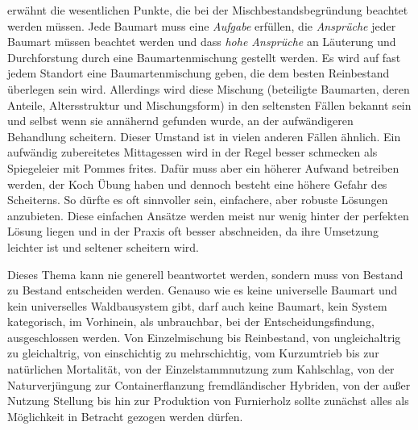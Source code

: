 \documentclass[twocolumn]{scrartcl}
\begin{document}
\citet[S.~218\,f.]{wiedemann1951Ertragskunde} erwähnt die wesentlichen Punkte,
die bei der Mischbestandsbegründung beachtet werden müssen. Jede Baumart muss
eine \emph{Aufgabe} erfüllen, die \emph{Ansprüche} jeder Baumart müssen beachtet
werden und dass \emph{hohe Ansprüche} an Läuterung und Durchforstung durch eine
Baumartenmischung gestellt werden. Es wird auf fast jedem Standort eine
Baumartenmischung geben, die dem besten Reinbestand überlegen sein wird.
Allerdings wird diese Mischung (beteiligte Baumarten, deren Anteile,
Altersstruktur und Mischungsform) in den seltensten Fällen bekannt sein und
selbst wenn sie annähernd gefunden wurde, an der aufwändigeren Behandlung
scheitern. Dieser Umstand ist in vielen anderen Fällen ähnlich. Ein aufwändig
zubereitetes Mittagessen wird in der Regel besser schmecken als Spiegeleier mit
Pommes frites. Dafür muss aber ein höherer Aufwand betreiben werden, der Koch
Übung haben und dennoch besteht eine höhere Gefahr des Scheiterns. So dürfte es
oft sinnvoller sein, einfachere, aber robuste Lösungen anzubieten. Diese
einfachen Ansätze werden meist nur wenig hinter der perfekten Lösung liegen und
in der Praxis oft besser abschneiden, da ihre Umsetzung leichter ist und
seltener scheitern wird.

Dieses Thema kann nie generell beantwortet werden, sondern muss von
Bestand zu Bestand entscheiden werden. Genauso wie es keine
universelle Baumart und kein universelles Waldbausystem gibt, darf
auch keine Baumart, kein System kategorisch, im Vorhinein, als
unbrauchbar, bei der Entscheidungsfindung, ausgeschlossen werden. Von
Einzelmischung bis Reinbestand, von ungleichaltrig zu gleichaltrig,
von einschichtig zu mehrschichtig, vom Kurzumtrieb bis zur natürlichen
Mortalität, von der Einzelstammnutzung zum Kahlschlag, von der
Naturverjüngung zur Containerflanzung fremdländischer Hybriden, von
der außer Nutzung Stellung bis hin zur Produktion von Furnierholz
sollte zunächst alles als Möglichkeit in Betracht gezogen werden
dürfen.




\end{document}
